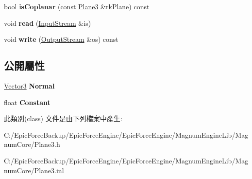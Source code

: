\begin{DoxyCompactItemize}
\item 
bool {\bfseries is\+Coplanar} (const \hyperlink{class_magnum_1_1_plane3}{Plane3} \&rk\+Plane) const \hypertarget{class_magnum_1_1_plane3_a64739dcdc6aea42e689abceb251d18a9}{}\label{class_magnum_1_1_plane3_a64739dcdc6aea42e689abceb251d18a9}

\item 
void {\bfseries read} (\hyperlink{class_magnum_1_1_input_stream}{Input\+Stream} \&is)\hypertarget{class_magnum_1_1_plane3_a3734c722f25c6189fd649d23b715a4f9}{}\label{class_magnum_1_1_plane3_a3734c722f25c6189fd649d23b715a4f9}

\item 
void {\bfseries write} (\hyperlink{class_magnum_1_1_output_stream}{Output\+Stream} \&os) const \hypertarget{class_magnum_1_1_plane3_a81d4ab6d6c6633ea3662a92f36b1c208}{}\label{class_magnum_1_1_plane3_a81d4ab6d6c6633ea3662a92f36b1c208}

\end{DoxyCompactItemize}
\subsection*{公開屬性}
\begin{DoxyCompactItemize}
\item 
\hyperlink{class_magnum_1_1_vector3}{Vector3} {\bfseries Normal}\hypertarget{class_magnum_1_1_plane3_aba69e0300ea381259478172d885504b9}{}\label{class_magnum_1_1_plane3_aba69e0300ea381259478172d885504b9}

\item 
float {\bfseries Constant}\hypertarget{class_magnum_1_1_plane3_abd159b29bda27439d568662a9026546a}{}\label{class_magnum_1_1_plane3_abd159b29bda27439d568662a9026546a}

\end{DoxyCompactItemize}


此類別(class) 文件是由下列檔案中產生\+:\begin{DoxyCompactItemize}
\item 
C\+:/\+Epic\+Force\+Backup/\+Epic\+Force\+Engine/\+Epic\+Force\+Engine/\+Magnum\+Engine\+Lib/\+Magnum\+Core/Plane3.\+h\item 
C\+:/\+Epic\+Force\+Backup/\+Epic\+Force\+Engine/\+Epic\+Force\+Engine/\+Magnum\+Engine\+Lib/\+Magnum\+Core/Plane3.\+inl\end{DoxyCompactItemize}
